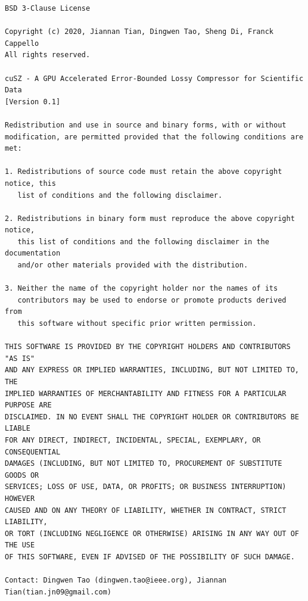 \begin{verbatim}
BSD 3-Clause License

Copyright (c) 2020, Jiannan Tian, Dingwen Tao, Sheng Di, Franck Cappello
All rights reserved.

cuSZ - A GPU Accelerated Error-Bounded Lossy Compressor for Scientific Data
[Version 0.1]

Redistribution and use in source and binary forms, with or without
modification, are permitted provided that the following conditions are met:

1. Redistributions of source code must retain the above copyright notice, this
   list of conditions and the following disclaimer.

2. Redistributions in binary form must reproduce the above copyright notice,
   this list of conditions and the following disclaimer in the documentation
   and/or other materials provided with the distribution.

3. Neither the name of the copyright holder nor the names of its
   contributors may be used to endorse or promote products derived from
   this software without specific prior written permission.

THIS SOFTWARE IS PROVIDED BY THE COPYRIGHT HOLDERS AND CONTRIBUTORS "AS IS"
AND ANY EXPRESS OR IMPLIED WARRANTIES, INCLUDING, BUT NOT LIMITED TO, THE
IMPLIED WARRANTIES OF MERCHANTABILITY AND FITNESS FOR A PARTICULAR PURPOSE ARE
DISCLAIMED. IN NO EVENT SHALL THE COPYRIGHT HOLDER OR CONTRIBUTORS BE LIABLE
FOR ANY DIRECT, INDIRECT, INCIDENTAL, SPECIAL, EXEMPLARY, OR CONSEQUENTIAL
DAMAGES (INCLUDING, BUT NOT LIMITED TO, PROCUREMENT OF SUBSTITUTE GOODS OR
SERVICES; LOSS OF USE, DATA, OR PROFITS; OR BUSINESS INTERRUPTION) HOWEVER
CAUSED AND ON ANY THEORY OF LIABILITY, WHETHER IN CONTRACT, STRICT LIABILITY,
OR TORT (INCLUDING NEGLIGENCE OR OTHERWISE) ARISING IN ANY WAY OUT OF THE USE
OF THIS SOFTWARE, EVEN IF ADVISED OF THE POSSIBILITY OF SUCH DAMAGE.

Contact: Dingwen Tao (dingwen.tao@ieee.org), Jiannan Tian(tian.jn09@gmail.com)
\end{verbatim}
